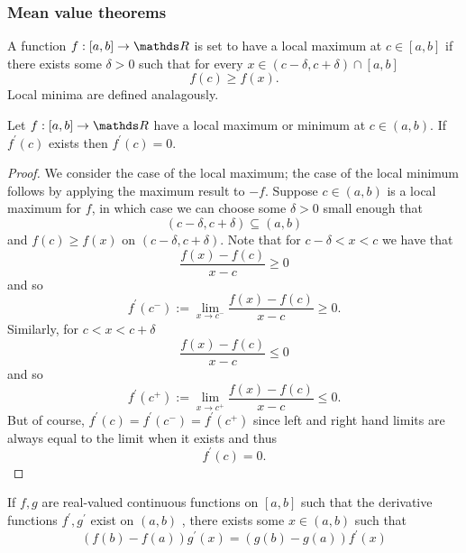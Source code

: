 \subsubsection{Mean value theorems}
\begin{defn}
\label{def:localMax}A function $f:\left[a,b\right]\to\R$ is set
to have a local maximum at $c\in\left[a,b\right]$ if there exists
some $\delta>0$ such that for every $x\in\left(c-\delta,c+\delta\right)\cap\left[a,b\right]$
\[
f\left(c\right)\geq f\left(x\right).
\]
Local minima are defined analagously.
\end{defn}

\begin{prop}
\label{prop:firstOrderConditionR}Let $f:\left[a,b\right]\to\R$ have
a local maximum or minimum at $c\in\left(a,b\right).$ If $f^{\prime}\left(c\right)$
exists then $f^{\prime}\left(c\right)=0.$
\end{prop}

\begin{proof}
We consider the case of the local maximum; the case of the local minimum
follows by applying the maximum result to $-f.$ Suppose $c\in\left(a,b\right)$
is a local maximum for $f$, in which case we can choose some $\delta>0$
small enough that 
\[
\left(c-\delta,c+\delta\right)\subseteq\left(a,b\right)
\]
and $f\left(c\right)\geq f\left(x\right)$ on $\left(c-\delta,c+\delta\right).$
Note that for $c-\delta<x<c$ we have that 
\[
\frac{f\left(x\right)-f\left(c\right)}{x-c}\geq0
\]
and so 
\[
f^{\prime}\left(c^{-}\right):=\lim_{x\to c^{-}}\frac{f\left(x\right)-f\left(c\right)}{x-c}\geq0.
\]
Similarly, for $c<x<c+\delta$
\[
\frac{f\left(x\right)-f\left(c\right)}{x-c}\leq0
\]
and so 
\[
f^{\prime}\left(c^{+}\right):=\lim_{x\to c^{+}}\frac{f\left(x\right)-f\left(c\right)}{x-c}\leq0.
\]
But of course, $f^{\prime}\left(c\right)=f^{\prime}\left(c^{-}\right)=f^{\prime}\left(c^{+}\right)$
since left and right hand limits are always equal to the limit when
it exists and thus 
\[
f^{\prime}\left(c\right)=0.
\]
\end{proof}
\begin{thm}
\label{thm:cauchyMeanValue}If $f,g$ are real-valued continuous
functions on $\left[a,b\right]$ such that the derivative functions
$f^{\prime},g^{\prime}$ exist on $\left(a,b\right)$ , there exists
some $x\in\left(a,b\right)$ such that 
\[
\left(f\left(b\right)-f\left(a\right)\right)g^{\prime}\left(x\right)=\left(g\left(b\right)-g\left(a\right)\right)f^{\prime}\left(x\right)
\]
\end{thm}

